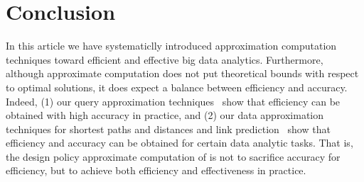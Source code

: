 \section{Conclusion}
\label{sec-conclusion}

In this article we have systematiclly introduced approximation computation techniques toward efficient and effective big data analytics.
Furthermore, although approximate computation does not put
theoretical bounds with respect to optimal solutions, it does expect a balance between efficiency and accuracy. Indeed, (1) our query approximation techniques~\cite{tods-MaCFHW14,LinMZWH17,MaHWLH17} show that efficiency can be obtained with high accuracy in practice, and (2) our data approximation techniques for shortest paths and distances and link prediction~\cite{MaFLWCH16,DuanMAMH17} show that efficiency and accuracy can be obtained for certain data analytic tasks. That is, the design policy approximate computation of is not to sacrifice accuracy for efficiency, but to achieve both efficiency and effectiveness in practice.


